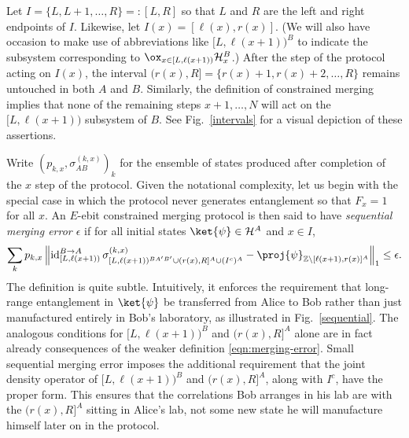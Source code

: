 \documentclass[12pt]{article}
\newcommand{\figref}[1]{Fig.~\ref{#1}}
\begin{document}
Let $I = \{ L, L+1, \ldots, R \} =: [L,R]$ so that $L$ and $R$ are the left and right endpoints of $I$. Likewise, let $I(x) = [\ell(x), r(x)]$. (We will also have occasion to make use of  abbreviations like $[L,\ell(x+1))^B$ to indicate the subsystem corresponding to $\ox_{x \in [L,\ell(x+1))} \mathcal{H}_x^B$.) After the step of the protocol acting on $I(x)$, the interval $(r(x),R] = \{ r(x) + 1, r(x) + 2, \ldots, R \}$ remains untouched in both $A$ and $B$. Similarly, the definition of constrained merging implies that none of the remaining steps $x+1,\ldots,N$ will act on the $[L,\ell(x+1))$ subsystem of $B$.  See \figref{intervals} for a visual depiction of these assertions.


Write $(p_{k,x},\sigma^{(k,x)}_{AB})_k$ for the ensemble of states produced after completion of the $x$ step of the protocol. Given the notational complexity, let us begin with the special case in which the protocol never generates entanglement so that $F_x = 1$ for all $x$.
An $E$-ebit constrained merging protocol is then said to have \emph{sequential merging error $\epsilon$} if for all initial states $\ket{\psi}\in \mathcal{H}^A$ and $x \in I$,
\begin{equation} \label{eqn:seq-merging-error0}
\sum_k p_{k,x} \left\|
 \operatorname{id}_{[L,\ell(x+1))}^{B \rightarrow A} \sigma^{(k,x)}_{[L,\ell(x+1))^{BA'B'} \cup (r(x),R]^A \cup (I^c)^A } -  \proj{\psi}_{\mathbb{Z} \setminus [\ell(x+1),r(x)]^A}
 \right\|_1 \leq \epsilon.
\end{equation}
The definition is quite subtle. Intuitively, it enforces the requirement that long-range entanglement in $\ket{\psi}$ be transferred from Alice to Bob rather than just manufactured entirely in Bob's laboratory, as illustrated in \figref{sequential}. The analogous conditions for $[L,\ell(x+1))^B$ and $(r(x),R]^A$ alone are in fact already consequences of the weaker definition \eqref{eqn:merging-error}. Small sequential merging error imposes the additional requirement that the joint density operator of $[L,\ell(x+1))^B$ and $(r(x),R]^A$, along with $I^c$, have the proper form. This ensures that the correlations Bob arranges in his lab are with the $(r(x),R]^A$ sitting in Alice's lab, not some new state he will manufacture himself later on in the protocol.
\end{document}
